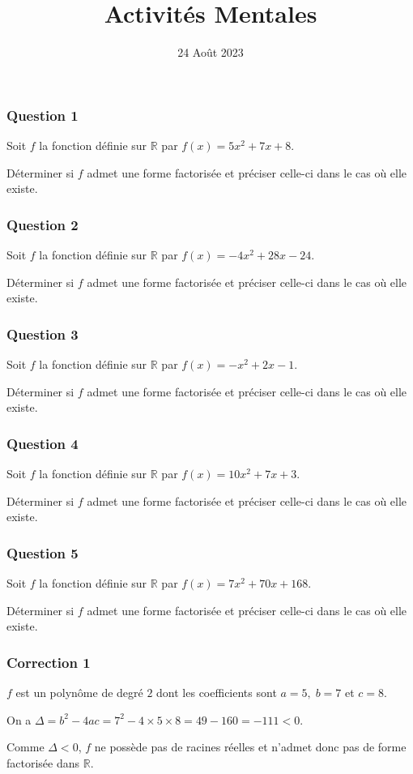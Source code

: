 \documentclass[15pt, mathserif]{beamer}
\title{Activités Mentales}
\date{24 Août 2023}
\begin{document}
\begin{frame}
    \titlepage
\end{frame}

\begin{frame} 
	\frametitle{Question 1}
Soit $f$ la fonction définie sur $\mathbb{R}$ par $f(x) = 5x^2+7x+8$.

 Déterminer si $f$ admet une forme factorisée et préciser celle-ci dans le cas où elle existe. \bigskip

\end{frame}


\begin{frame} 
	\frametitle{Question 2}
Soit $f$ la fonction définie sur $\mathbb{R}$ par $f(x) = -4x^2+28x-24$.

 Déterminer si $f$ admet une forme factorisée et préciser celle-ci dans le cas où elle existe. \bigskip

\end{frame}


\begin{frame} 
	\frametitle{Question 3}
Soit $f$ la fonction définie sur $\mathbb{R}$ par $f(x) = -x^2+2x-1$.

 Déterminer si $f$ admet une forme factorisée et préciser celle-ci dans le cas où elle existe. \bigskip

\end{frame}


\begin{frame} 
	\frametitle{Question 4}
Soit $f$ la fonction définie sur $\mathbb{R}$ par $f(x) = 10x^2+7x+3$.

 Déterminer si $f$ admet une forme factorisée et préciser celle-ci dans le cas où elle existe. \bigskip

\end{frame}


\begin{frame} 
	\frametitle{Question 5}
Soit $f$ la fonction définie sur $\mathbb{R}$ par $f(x) = 7x^2+70x+168$.

 Déterminer si $f$ admet une forme factorisée et préciser celle-ci dans le cas où elle existe. \bigskip

\end{frame}


\begin{frame}
\vspace{-10mm}
	\frametitle{Correction 1}
$f$ est un polynôme de degré $2$ dont les coefficients sont $a =5, \; b =7$ et $c =8$.
 
 On a $\Delta = b^2-4ac =7^2-4 \times5\times8=49-160 = -111<0$.


 
 Comme $\Delta <0$, $f$ ne possède pas de racines réelles et n'admet donc pas de forme factorisée dans $\mathbb{R}$.\end{frame}
\end{document}
